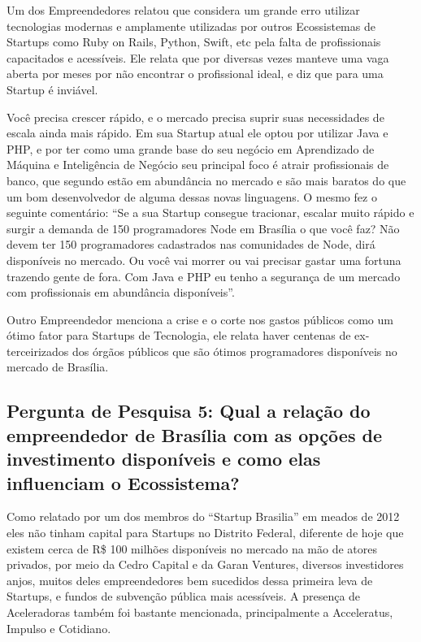 Um dos Empreendedores relatou que considera um grande erro utilizar tecnologias modernas e amplamente utilizadas por outros Ecossistemas de Startups como Ruby on Rails, Python, Swift, etc pela falta de profissionais capacitados e acessíveis. Ele relata que por diversas vezes manteve uma vaga aberta por meses por não encontrar o profissional ideal, e diz que para uma Startup é inviável. 

Você precisa crescer rápido, e o mercado precisa suprir suas necessidades de escala ainda mais rápido. Em sua Startup atual ele optou por utilizar Java e PHP, e por ter como uma grande base do seu negócio em Aprendizado de Máquina e Inteligência de Negócio seu principal foco é atrair profissionais de banco, que segundo estão em abundância no mercado e são mais baratos do que um bom desenvolvedor de alguma dessas novas linguagens. O mesmo fez o seguinte comentário: ``Se a sua Startup consegue tracionar, escalar muito rápido e surgir a demanda de 150 programadores Node em Brasília o que você faz? Não devem ter 150 programadores cadastrados nas comunidades de Node, dirá disponíveis no mercado. Ou você vai morrer ou vai precisar gastar uma fortuna trazendo gente de fora. Com Java e PHP eu tenho a segurança de um mercado com profissionais em abundância disponíveis''.

Outro Empreendedor menciona a crise e o corte nos gastos públicos como um ótimo fator para Startups de Tecnologia, ele relata haver centenas de ex-terceirizados dos órgãos públicos que são ótimos programadores disponíveis no mercado de Brasília.

\subsection{Pergunta de Pesquisa 5: Qual a relação do empreendedor de Brasília com as opções de investimento disponíveis e como elas influenciam o Ecossistema?}
\label{subsection:pergunta_de_pesquisa_5}

Como relatado por um dos membros do ``Startup Brasilia'' em meados de 2012 eles não tinham capital para Startups no Distrito Federal, diferente de hoje que existem cerca de R\$ 100 milhões disponíveis no mercado na mão de atores privados, por meio da Cedro Capital e da Garan Ventures, diversos investidores anjos, muitos deles empreendedores bem sucedidos dessa primeira leva de Startups, e fundos de subvenção pública mais acessíveis. A presença de Aceleradoras também foi bastante mencionada, principalmente a Acceleratus, Impulso e Cotidiano. 

